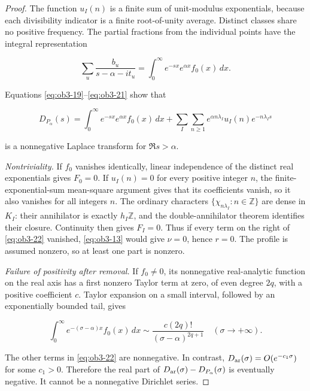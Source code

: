 \begin{proof}
The function \(u_I(n)\) is a finite sum of unit-modulus exponentials, because each divisibility indicator is a finite root-of-unity average. Distinct classes share no positive frequency. The partial fractions from the individual points have the integral representation

\begin{equation}\label{eq:ob3-21}
\sum_u\frac{b_u}{s-\alpha-it_u}
=\int_0^\infty e^{-sx}e^{\alpha x}f_0(x)\,dx.
\end{equation}

Equations \eqref{eq:ob3-19}--\eqref{eq:ob3-21} show that

\begin{equation}\label{eq:ob3-22}
D_{P_\alpha}(s)=
\int_0^\infty e^{-sx}e^{\alpha x}f_0(x)\,dx
+\sum_I\sum_{n\ge1}
e^{\alpha n\lambda_I}u_I(n)e^{-n\lambda_I s}
\end{equation}

is a nonnegative Laplace transform for \(\Re s>\alpha\).

\textit{Nontriviality.} If \(f_0\) vanishes identically, linear independence of the distinct real exponentials gives \(F_0=0\). If \(u_I(n)=0\) for every positive integer \(n\), the finite-exponential-sum mean-square argument gives that its coefficients vanish, so it also vanishes for all integers \(n\). The ordinary characters \(\{\chi_{n\lambda_I}:n\in\mathbb Z\}\) are dense in \(K_I\): their annihilator is exactly \(h_I\mathbb Z\), and the double-annihilator theorem \citep[Lemma~12.5.2]{dikranjan2018} identifies their closure. Continuity then gives \(F_I=0\). Thus if every term on the right of \eqref{eq:ob3-22} vanished, \eqref{eq:ob3-13} would give \(\nu=0\), hence \(r=0\). The profile is assumed nonzero, so at least one part is nonzero.

\textit{Failure of positivity after removal.} If \(f_0\ne0\), its nonnegative real-analytic function on the real axis has a first nonzero Taylor term at zero, of even degree \(2q\), with a positive coefficient \(c\). Taylor expansion on a small interval, followed by an exponentially bounded tail, gives

\begin{equation}\label{eq:ob3-23}
\int_0^\infty e^{-(\sigma-\alpha)x}f_0(x)\,dx
\sim \frac{c(2q)!}{(\sigma-\alpha)^{2q+1}}
\quad(\sigma\to+\infty).
\end{equation}

The other terms in \eqref{eq:ob3-22} are nonnegative. In contrast, \(D_{\rm ar}(\sigma)=O(e^{-c_1\sigma})\) for some \(c_1>0\). Therefore the real part of \(D_{\rm ar}(\sigma)-D_{P_\alpha}(\sigma)\) is eventually negative. It cannot be a nonnegative Dirichlet series.


\end{proof}
